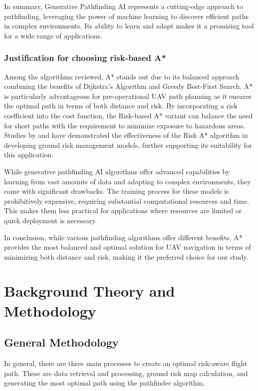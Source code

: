 \documentclass[12pt]{report}
\begin{document}
        In summary, Generative Pathfinding AI represents a cutting-edge approach to pathfinding, leveraging the power
        of machine learning to discover efficient paths in complex environments. Its ability to learn and adapt makes it
        a promising tool for a wide range of applications.

        \subsection{Justification for choosing risk-based A*}
        Among the algorithms reviewed, A* stands out due to its balanced approach combining the benefits of Dijkstra's
        Algorithm and Greedy Best-First Search. A* is particularly advantageous for pre-operational UAV path planning as
        it ensures the optimal path in terms of both distance and risk. By incorporating a risk coefficient into the
        cost function, the Risk-based A* variant can balance the need for short paths with the requirement to minimize
        exposure to hazardous areas. Studies by \cite{primatesta_ground_2020} and \cite{clothier_casualty_2007} have
        demonstrated the effectiveness of the Risk A* algorithm in developing ground risk management models, further
        supporting its suitability for this application.
            
        While generative pathfinding AI algorithms offer advanced capabilities by learning from vast amounts of data and
        adapting to complex environments, they come with significant drawbacks. The training process for these models is
        prohibitively expensive, requiring substantial computational resources and time. This makes them less practical
        for applications where resources are limited or quick deployment is necessary.
            
        In conclusion, while various pathfinding algorithms offer different benefits, A* provides the most balanced and
        optimal solution for UAV navigation in terms of minimizing both distance and risk, making it the preferred
        choice for our study.

\chapter{Background Theory and Methodology}
    \section{General Methodology}
        In general, there are three main processes to create an optimal risk-aware flight path. These are data
        retrieval and processing, ground risk map calculation, and generating the most optimal path using the pathfinder
        algorithm.
\end{document}
